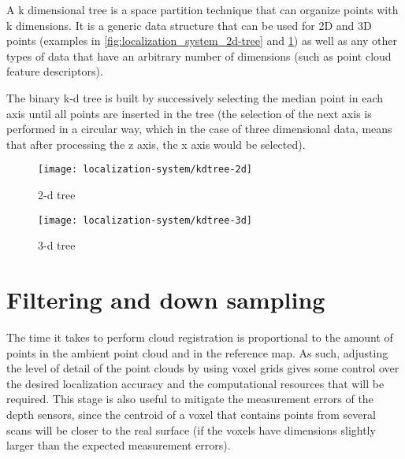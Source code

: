 A k dimensional tree is a space partition technique that can organize points with k dimensions. It is a generic data structure that can be used for 2D and 3D points (examples in \cref{fig:localization_system_2d-tree} and \cref{fig:localization_system_3d-tree}) as well as any other types of data that have an arbitrary number of dimensions (such as point cloud feature descriptors).

The binary k-d tree is built by successively selecting the median point in each axis until all points are inserted in the tree (the selection of the next axis is performed in a circular way, which in the case of three dimensional data, means that after processing the z axis, the x axis would be selected).

\begin{savenotes}
\begin{figure}[H]
	\centering
	\begin{minipage}[h]{0.495\textwidth}
		\centering
		\texttt{[image: localization-system/kdtree-2d]}
		\caption[2-d tree]{2-d tree\protect\footnotemark}
		\label{fig:localization_system_2d-tree}
	\end{minipage}\hfill
	\begin{minipage}[h]{0.495\textwidth}
		\centering
		\texttt{[image: localization-system/kdtree-3d]}
		\caption[3-d tree]{3-d tree\protect\footnotemark}
		\label{fig:localization_system_3d-tree}
	\end{minipage}
\end{figure}
\end{savenotes}



\section{Filtering and down sampling}\label{fig:localization_system_filtering-and-down-sampling}

The time it takes to perform cloud registration is proportional to the amount of points in the ambient point cloud and in the reference map. As such, adjusting the level of detail of the point clouds by using voxel grids gives some control over the desired localization accuracy and the computational resources that will be required. This stage is also useful to mitigate the measurement errors of the depth sensors, since the centroid of a voxel that contains points from several scans will be closer to the real surface (if the voxels have dimensions slightly larger than the expected measurement errors).

